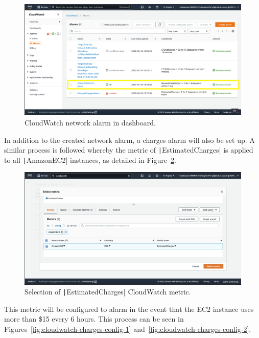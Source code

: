 \begin{figure}[!htbp]
    \centering
    \includegraphics[width=\textwidth]{resources/cloudwatch/cloudwatch-network-alarm-complete}
    \caption{CloudWatch network alarm in dashboard.}
    \label{fig:cloudwatch-network-alarm}
\end{figure}

In addition to the created network alarm, a charges alarm will also be set up.
A similar process is followed whereby the metric of \texttt|EstimatedCharges| is applied to all
\texttt|AmazonEC2| instances, as detailed in Figure~\ref{fig:cloudwatch-metric-charges}.

\begin{figure}[!htbp]
    \centering
    \includegraphics[width=\textwidth]{resources/cloudwatch/cloudwatch-metric-charges}
    \caption{Selection of \texttt|EstimatedCharges| CloudWatch metric.}
    \label{fig:cloudwatch-metric-charges}
\end{figure}

\clearpage
This metric will be configured to alarm in the event that the EC2 instance uses more than \$15 every 6 hours.
This process can be seen in Figures~\ref{fig:cloudwatch-charges-config-1} and~\ref{fig:cloudwatch-charges-config-2}.

